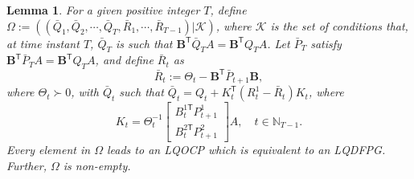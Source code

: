 \documentclass[letterpaper, 10 pt, conference]{ieeeconf}  %
\newcommand{\transpose}{\mathsf{T}}
\newtheorem{lemma}{Lemma}
\begin{document}
\begin{lemma}
    \cite[Theorem 7]{prasad_structure_2023}
    For a given positive integer $T$, define
        $\Omega := ((\bar{Q}_{1},\bar{Q}_{2},\cdots,\bar{Q}_{T},\bar{R}_{1},\cdots,\bar{R}_{T-1})|\mathcal{K})$,
    where $\mathcal{K}$ is the set of conditions that, at time instant $T$, $\bar{Q}_{T}$ is such that
            $\mathbf{B}^{\transpose}\bar{Q}_{T}A = \mathbf{B}^{\transpose}Q_{T}A$.
        Let $\bar{P}_{T}$ satisfy
            $\mathbf{B}^{\transpose}\bar{P}_{T}A = \mathbf{B}^{\transpose}Q_{T}A$, and define $\bar{R}_{t}$ as
            \begin{equation}\label{eq:matrixR}
            \bar{R}_{t} := \Theta_{t} - \mathbf{B}^{\transpose}\bar{P}_{t+1}\mathbf{B},
            \end{equation}
        where $\Theta_{t} \succ 0$,
        with $\bar{Q}_{t}$ such that
            $\bar{Q}_{t} = Q_{t} + K_{t}^{\transpose}(R_{t}^{1}-\bar{R}_{t})K_{t}$,
        where
        \begin{equation*}
            K_{t} = \Theta_{t}^{-1}
            \begin{bmatrix}
                B_{t}^{1\transpose}P_{t+1}^{1}\\
                B_{t}^{2\transpose}P_{t+1}^{2}
            \end{bmatrix}
            A,\quad t\in \mathbb{N}_{T-1}.
        \end{equation*}
    Every element in $\Omega$ leads to an LQOCP which is equivalent to an LQDFPG. Further, $\Omega$ is non-empty.
\end{lemma}
\end{document}
